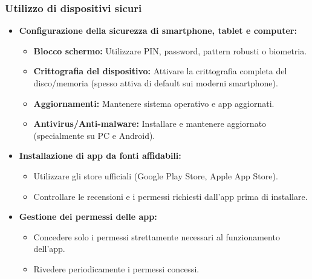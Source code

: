\documentclass{beamer}
\begin{document}
\begin{frame}
  \frametitle{Utilizzo di dispositivi sicuri}
  \begin{itemize}
    \item \textbf{Configurazione della sicurezza di smartphone, tablet e computer:}
    \begin{itemize}
        \item \textbf{Blocco schermo:} Utilizzare PIN, password, pattern robusti o biometria.
        \item \textbf{Crittografia del dispositivo:} Attivare la crittografia completa del disco/memoria (spesso attiva di default sui moderni smartphone).
        \item \textbf{Aggiornamenti:} Mantenere sistema operativo e app aggiornati.
        \item \textbf{Antivirus/Anti-malware:} Installare e mantenere aggiornato (specialmente su PC e Android).
    \end{itemize}
    \item \textbf{Installazione di app da fonti affidabili:}
    \begin{itemize}
        \item Utilizzare gli store ufficiali (Google Play Store, Apple App Store).
        \item Controllare le recensioni e i permessi richiesti dall'app prima di installare.
    \end{itemize}
    \item \textbf{Gestione dei permessi delle app:}
    \begin{itemize}
        \item Concedere solo i permessi strettamente necessari al funzionamento dell'app.
        \item Rivedere periodicamente i permessi concessi.
    \end{itemize}
  \end{itemize}
\end{frame}
\end{document}
